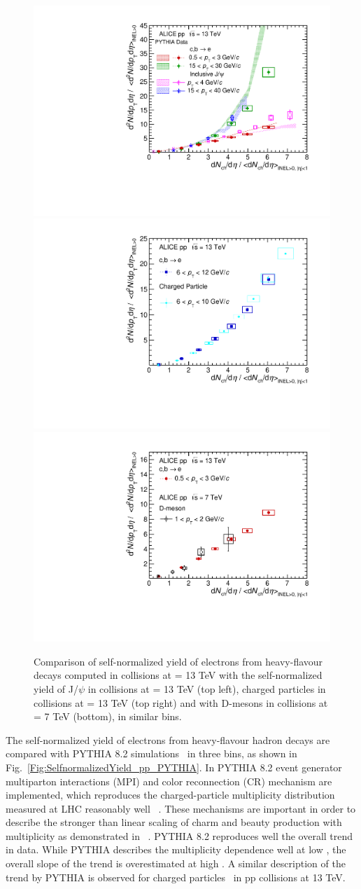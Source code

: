\begin{figure}[!h]
\centering
\includegraphics[width=0.45\linewidth]{figures/Results/HFE_ppNormalB/SNY_JPsi_PYTHIA_0.pdf}
\includegraphics[width=0.45\linewidth]{figures/Results/HFE_ppNormalB/SNY_ChargedParticles_High_6_10.pdf}
\includegraphics[width=0.45\linewidth]{figures/Results/HFE_ppNormalB/SNY_Dmeson_0.pdf}
\caption{Comparison of self-normalized yield of electrons from heavy-flavour decays computed in \pp collisions at \sqrts = 13 TeV  with the self-normalized yield of J/$\psi$ in \pp collisions at \sqrts = 13 TeV (top left), charged particles in \pp collisions at \sqrts = 13 TeV (top right) and with D-mesons in \pp collisions at \sqrts = 7 TeV (bottom), in \pt similar \pt bins.}
     \label{Fig:SNY_CompOtherPart_pp}
\end{figure}


The self-normalized yield of electrons from heavy-flavour hadron decays are compared with PYTHIA 8.2 simulations~\cite{Sjostrand:2014zea} in three \pt bins, as shown in Fig.~\ref{Fig:SelfnormalizedYield_pp_PYTHIA}. In PYTHIA 8.2 event generator multiparton interactions (MPI) and color reconnection (CR) mechanism are implemented,  which reproduces the charged-particle multiplicity distribution measured at LHC reasonably well ~\cite{Adam:2016mkz,Weber:2017kjj}. These mechanisms are important in order to describe the stronger than linear scaling of charm and beauty production with multiplicity as demonstrated in ~\cite{Adam:2015ota}. PYTHIA 8.2 reproduces well the overall trend in data. While PYTHIA describes the multiplicity dependence well at low \pt, the overall slope of the trend is overestimated at high \pt. A similar description of the \pt trend by PYTHIA is observed for charged particles~\cite{Acharya:2019mzb} in pp collisions at 13 TeV.   

